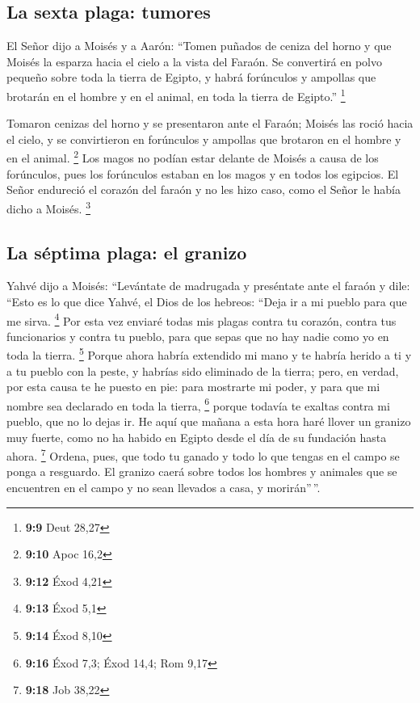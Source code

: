 \hypertarget{la-sexta-plaga-tumores}{%
\subsection{La sexta plaga: tumores}\label{la-sexta-plaga-tumores}}

 El Señor dijo a Moisés y a Aarón: ``Tomen puñados de
ceniza del horno y que Moisés la esparza hacia el cielo a la vista del
Faraón.  Se convertirá en polvo pequeño sobre toda la
tierra de Egipto, y habrá forúnculos y ampollas que brotarán en el
hombre y en el animal, en toda la tierra de Egipto.'' \footnote{\textbf{9:9}
  Deut 28,27}

 Tomaron cenizas del horno y se presentaron ante el
Faraón; Moisés las roció hacia el cielo, y se convirtieron en forúnculos
y ampollas que brotaron en el hombre y en el animal. \footnote{\textbf{9:10}
  Apoc 16,2}  Los magos no podían estar delante de Moisés
a causa de los forúnculos, pues los forúnculos estaban en los magos y en
todos los egipcios.  El Señor endureció el corazón del
faraón y no les hizo caso, como el Señor le había dicho a Moisés.
\footnote{\textbf{9:12} Éxod 4,21}

\hypertarget{la-suxe9ptima-plaga-el-granizo}{%
\subsection{La séptima plaga: el
granizo}\label{la-suxe9ptima-plaga-el-granizo}}

 Yahvé dijo a Moisés: ``Levántate de madrugada y
preséntate ante el faraón y dile: ``Esto es lo que dice Yahvé, el Dios
de los hebreos: ``Deja ir a mi pueblo para que me sirva. \footnote{\textbf{9:13}
  Éxod 5,1}  Por esta vez enviaré todas mis plagas contra
tu corazón, contra tus funcionarios y contra tu pueblo, para que sepas
que no hay nadie como yo en toda la tierra. \footnote{\textbf{9:14} Éxod
  8,10}  Porque ahora habría extendido mi mano y te
habría herido a ti y a tu pueblo con la peste, y habrías sido eliminado
de la tierra;  pero, en verdad, por esta causa te he
puesto en pie: para mostrarte mi poder, y para que mi nombre sea
declarado en toda la tierra, \footnote{\textbf{9:16} Éxod 7,3; Éxod
  14,4; Rom 9,17}  porque todavía te exaltas contra mi
pueblo, que no lo dejas ir.  He aquí que mañana a esta
hora haré llover un granizo muy fuerte, como no ha habido en Egipto
desde el día de su fundación hasta ahora. \footnote{\textbf{9:18} Job
  38,22}  Ordena, pues, que todo tu ganado y todo lo que
tengas en el campo se ponga a resguardo. El granizo caerá sobre todos
los hombres y animales que se encuentren en el campo y no sean llevados
a casa, y morirán''\,''.

